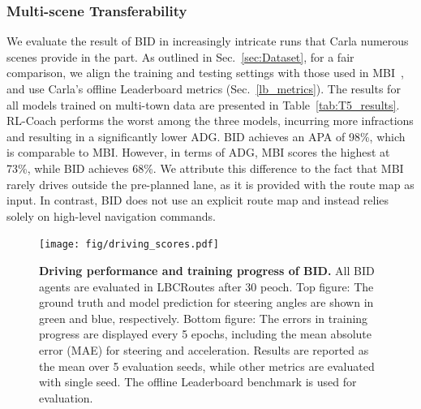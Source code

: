 \subsubsection{Multi-scene Transferability}\label{sec:multi_towns_result}
\hspace{1pc}We evaluate the result of BID in increasingly intricate runs that Carla numerous scenes provide in the part. 
As outlined in Sec.~\ref{sec:Dataset}, for a fair comparison, we align the training and testing settings with those used in MBI~\cite{Hu:2022}, and use Carla's offline Leaderboard metrics (Sec.~\ref{lb_metrics}). 
The results for all models trained on multi-town data are presented in Table~\ref{tab:T5_results}. 
RL-Coach performs the worst among the three models, incurring more infractions and resulting in a significantly lower ADG. 
BID achieves an APA of 98\%, which is comparable to MBI. 
However, in terms of ADG, MBI scores the highest at 73\%, while BID achieves 68\%. 
We attribute this difference to the fact that MBI rarely drives outside the pre-planned lane, as it is provided with the route map as input. 
In contrast, BID does not use an explicit route map and instead relies solely on high-level navigation commands.

\begin{figure}[t]
	\centering
	\texttt{[image: fig/driving\_scores.pdf]}
	\vspace{-1ex}
	\caption{\textbf{Driving performance and training progress of BID.} 
		All BID agents are evaluated in LBCRoutes after 30 peoch.
		Top figure: The ground truth and model prediction for steering angles are shown in green and blue, respectively.
		Bottom figure: The errors in training progress are displayed every 5 epochs, including the mean absolute error (MAE) for steering and acceleration.
		Results are reported as the mean over 5 evaluation seeds, while other metrics are evaluated with single seed. 
		The offline Leaderboard benchmark is used for evaluation.}
	\vspace{-1.5ex}
	\label{fig:score_eu_lb_tt_tn}
\end{figure}


